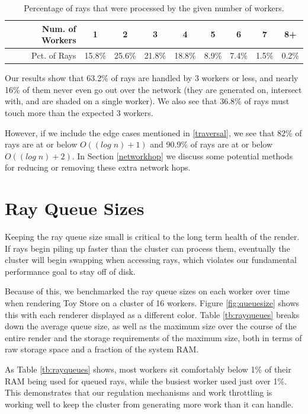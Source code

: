 \documentclass[12pt]{ucthesis}
\begin{document}
\begin{table}
\begin{center}
\begin{tabular}{|r||c|c|c|c|c|c|c|c|}
    \hline
    Num. of Workers& 1 & 2 & 3 & 4 & 5 & 6 & 7 & 8+ \\
    \hline
    Pct. of Rays & 15.8\% & 25.6\% & 21.8\% & 18.8\% & 8.9\% & 7.4\% & 1.5\% & 0.2\% \\
    \hline
\end{tabular}
\caption{Percentage of rays that were processed by the given number of workers.}
\label{tb:nethopspercent}
\end{center}
\end{table}

Our results show that 63.2\% of rays are handled by 3 workers or less, and
nearly 16\% of them never even go out over the network (they are generated on,
intersect with, and are shaded on a single worker). We also see that 36.8\% of
rays must touch more than the expected 3 workers.

However, if we include the edge cases mentioned in \ref{traversal}, we see that
82\% of rays are at or below $O((log\;n) + 1)$ and 90.9\% of rays are at or
below $O((log\;n) + 2)$. In Section \ref{networkhop} we discuss some potential
methods for reducing or removing these extra network hops.

\section{Ray Queue Sizes}
\label{queuesizes}

Keeping the ray queue size small is critical to the long term health of the
render. If rays begin piling up faster than the cluster can process them,
eventually the cluster will begin swapping when accessing rays, which violates
our fundamental performance goal to stay off of disk.

Because of this, we benchmarked the ray queue sizes on each worker over time
when rendering Toy Store on a cluster of 16 workers. Figure \ref{fig:queuesize}
shows this with each renderer displayed as a different color. Table \ref{tb:rayqueues}
breaks down the average queue size, as well as the maximum size over the course
of the entire render and the storage requirements of the maximum size, both in
terms of raw storage space and a fraction of the system RAM.

As Table \ref{tb:rayqueues} shows, most workers sit comfortably below 1\% of
their RAM being used for queued rays, while the busiest worker used just over
1\%. This demonstrates that our regulation mechanisms and work throttling is
working well to keep the cluster from generating more work than it can handle.
\end{document}
